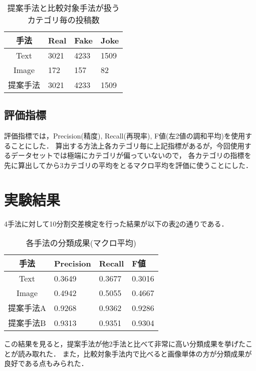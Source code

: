 \begin{table}[h]
    \caption{提案手法と比較対象手法が扱うカテゴリ毎の投稿数}
    \label{table:posts}
    \centering
    \begin{tabular}{clll}
        \hline
        手法 & Real & Fake & Joke \\
        \hline \hline
        Text & 3021 & 4233 & 1509 \\
        Image & 172 & 157 & 82 \\
        提案手法 & 3021 & 4233 & 1509 \\
        \hline
    \end{tabular}
\end{table}

\subsection{評価指標}
評価指標では，Precision(精度), Recall(再現率), F値(左2値の調和平均)を使用することにした．
算出する方法上各カテゴリ毎に上記指標があるが，今回使用するデータセットでは極端にカテゴリが偏っていないので，
各カテゴリの指標を先に算出してから3カテゴリの平均をとるマクロ平均を評価に使うことにした．

\section{実験結果}
4手法に対して10分割交差検定を行った結果が以下の表\ref{table:result}の通りである．
% 
\begin{table}[h]
    \caption{各手法の分類成果(マクロ平均)}
    \label{table:result}
    \centering
    \begin{tabular}{clll}
        \hline
        手法 & Precision & Recall & F値 \\
        \hline \hline
        Text & 0.3649 & 0.3677 & 0.3016 \\
        Image & 0.4942 & 0.5055 & 0.4667 \\
        提案手法A & 0.9268 & 0.9362 & 0.9286 \\
        提案手法B & 0.9313 & 0.9351 & 0.9304 \\
        \hline
    \end{tabular}
\end{table}

この結果を見ると，提案手法が他2手法と比べて非常に高い分類成果を挙げたことが読み取れた．
また，比較対象手法内で比べると画像単体の方が分類成果が良好である点もみられた．

